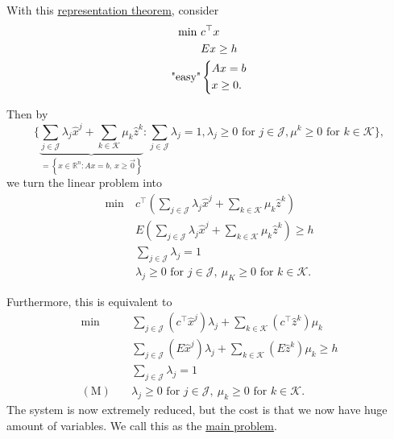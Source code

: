 With this \hyperref[thm:representation]{representation theorem}, consider
\[
	\begin{aligned}
		\min~         & c^{\top}x     \\
		              & Ex\geq h      \\
		\text{"easy"} & \begin{dcases}
			                Ax = b \\
			                x\geq 0.
		                \end{dcases}
	\end{aligned}
\]

Then by
\[
	\Bigg\{\underbrace{\sum\limits_{j\in\mathcal{J}} \lambda_{j} \hat{x}^j + \sum\limits_{k\in\mathcal{K}}\mu_k \hat{z}^k}_{=\left\{x\in\mathbb{R}^n\colon Ax = b,\ x\geq \vec{0}\right\}}
	\colon \sum\limits_{j\in\mathcal{J}}\lambda_{j} = 1, \lambda_{j}\geq 0 \text{ for }j\in \mathcal{J}, \mu^k\geq 0\text{ for } k\in \mathcal{K}\Bigg\},
\]
we turn the linear problem into
\[
	\begin{aligned}
		\min~ & c^{\top}\left(\sum\limits_{j\in\mathcal{J}}\lambda_{j}\hat{x}^j + \sum\limits_{k\in\mathcal{K}}\mu_k \hat{z}^k  \right) \\
		      & E\left(\sum\limits_{j\in\mathcal{J}}\lambda_{j}\hat{x}^j + \sum\limits_{k\in\mathcal{K}}\mu_k \hat{z}^k  \right) \geq h \\
		      & \sum\limits_{j\in\mathcal{J}}\lambda_{j} = 1                                                                            \\
		      & \lambda_{j}\geq 0 \text{ for }j\in\mathcal{J},\ \mu_K\geq 0 \text{ for }k\in\mathcal{K}.
	\end{aligned}
\]

Furthermore, this is equivalent to
\[
	\begin{aligned}
		\min~             & \sum\limits_{j\in\mathcal{J}}\left(c^{\top}\hat{x}^j\right)\lambda_{j} + \sum\limits_{k\in\mathcal{K}}\left(c^{\top} \hat{z}^k  \right)\mu_k \\
		                  & \sum\limits_{j\in\mathcal{J}}\left(E\hat{x}^j\right)\lambda_{j} + \sum\limits_{k\in\mathcal{K}}\left(E \hat{z}^k \right)\mu_k \geq h         \\
		                  & \sum\limits_{j\in\mathcal{J}}\lambda_{j} = 1                                                                                                 \\
		(\mathrm{M})\quad & \lambda_{j}\geq 0 \text{ for }j\in\mathcal{J},\ \mu_k\geq 0 \text{ for }k\in\mathcal{K}.
	\end{aligned}
\]
The system is now extremely reduced, but the cost is that we now have huge amount of variables. We call this as the \hyperref[def:main-problem]{main problem}.

